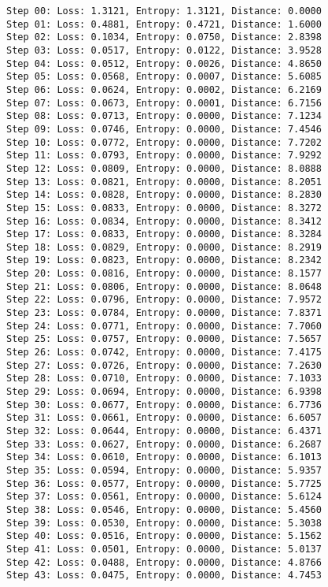 \documentclass[11pt]{article}
\begin{document}
    \begin{Verbatim}[commandchars=\\\{\}]
Step 00: Loss: 1.3121, Entropy: 1.3121, Distance: 0.0000
Step 01: Loss: 0.4881, Entropy: 0.4721, Distance: 1.6000
Step 02: Loss: 0.1034, Entropy: 0.0750, Distance: 2.8398
Step 03: Loss: 0.0517, Entropy: 0.0122, Distance: 3.9528
Step 04: Loss: 0.0512, Entropy: 0.0026, Distance: 4.8650
Step 05: Loss: 0.0568, Entropy: 0.0007, Distance: 5.6085
Step 06: Loss: 0.0624, Entropy: 0.0002, Distance: 6.2169
Step 07: Loss: 0.0673, Entropy: 0.0001, Distance: 6.7156
Step 08: Loss: 0.0713, Entropy: 0.0000, Distance: 7.1234
Step 09: Loss: 0.0746, Entropy: 0.0000, Distance: 7.4546
Step 10: Loss: 0.0772, Entropy: 0.0000, Distance: 7.7202
Step 11: Loss: 0.0793, Entropy: 0.0000, Distance: 7.9292
Step 12: Loss: 0.0809, Entropy: 0.0000, Distance: 8.0888
Step 13: Loss: 0.0821, Entropy: 0.0000, Distance: 8.2051
Step 14: Loss: 0.0828, Entropy: 0.0000, Distance: 8.2830
Step 15: Loss: 0.0833, Entropy: 0.0000, Distance: 8.3272
Step 16: Loss: 0.0834, Entropy: 0.0000, Distance: 8.3412
Step 17: Loss: 0.0833, Entropy: 0.0000, Distance: 8.3284
Step 18: Loss: 0.0829, Entropy: 0.0000, Distance: 8.2919
Step 19: Loss: 0.0823, Entropy: 0.0000, Distance: 8.2342
Step 20: Loss: 0.0816, Entropy: 0.0000, Distance: 8.1577
Step 21: Loss: 0.0806, Entropy: 0.0000, Distance: 8.0648
Step 22: Loss: 0.0796, Entropy: 0.0000, Distance: 7.9572
Step 23: Loss: 0.0784, Entropy: 0.0000, Distance: 7.8371
Step 24: Loss: 0.0771, Entropy: 0.0000, Distance: 7.7060
Step 25: Loss: 0.0757, Entropy: 0.0000, Distance: 7.5657
Step 26: Loss: 0.0742, Entropy: 0.0000, Distance: 7.4175
Step 27: Loss: 0.0726, Entropy: 0.0000, Distance: 7.2630
Step 28: Loss: 0.0710, Entropy: 0.0000, Distance: 7.1033
Step 29: Loss: 0.0694, Entropy: 0.0000, Distance: 6.9398
Step 30: Loss: 0.0677, Entropy: 0.0000, Distance: 6.7736
Step 31: Loss: 0.0661, Entropy: 0.0000, Distance: 6.6057
Step 32: Loss: 0.0644, Entropy: 0.0000, Distance: 6.4371
Step 33: Loss: 0.0627, Entropy: 0.0000, Distance: 6.2687
Step 34: Loss: 0.0610, Entropy: 0.0000, Distance: 6.1013
Step 35: Loss: 0.0594, Entropy: 0.0000, Distance: 5.9357
Step 36: Loss: 0.0577, Entropy: 0.0000, Distance: 5.7725
Step 37: Loss: 0.0561, Entropy: 0.0000, Distance: 5.6124
Step 38: Loss: 0.0546, Entropy: 0.0000, Distance: 5.4560
Step 39: Loss: 0.0530, Entropy: 0.0000, Distance: 5.3038
Step 40: Loss: 0.0516, Entropy: 0.0000, Distance: 5.1562
Step 41: Loss: 0.0501, Entropy: 0.0000, Distance: 5.0137
Step 42: Loss: 0.0488, Entropy: 0.0000, Distance: 4.8766
Step 43: Loss: 0.0475, Entropy: 0.0000, Distance: 4.7453

\end{Verbatim}
\end{document}
